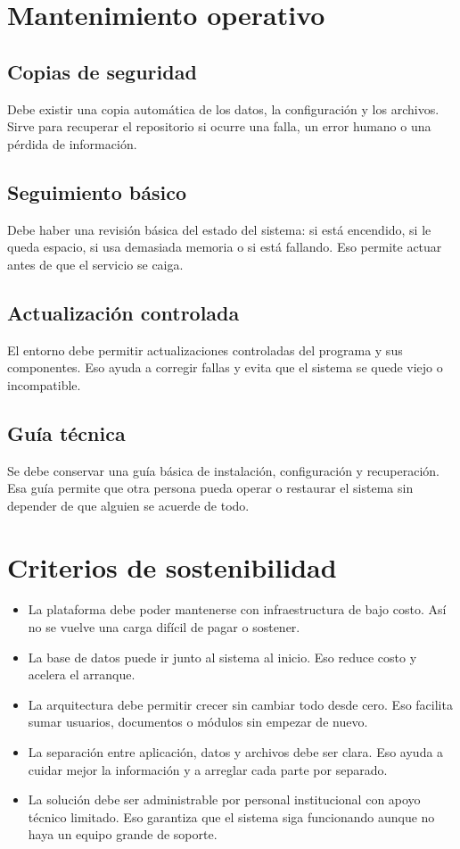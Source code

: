 \documentclass[12pt,a4paper]{report}
\begin{document}
\section*{Mantenimiento operativo}
\subsection*{Copias de seguridad}
Debe existir una copia automática de los datos, la configuración y los archivos. Sirve para recuperar el repositorio si ocurre una falla, un error humano o una pérdida de información.

\subsection*{Seguimiento básico}
Debe haber una revisión básica del estado del sistema: si está encendido, si le queda espacio, si usa demasiada memoria o si está fallando. Eso permite actuar antes de que el servicio se caiga.

\subsection*{Actualización controlada}
El entorno debe permitir actualizaciones controladas del programa y sus componentes. Eso ayuda a corregir fallas y evita que el sistema se quede viejo o incompatible.

\subsection*{Guía técnica}
Se debe conservar una guía básica de instalación, configuración y recuperación. Esa guía permite que otra persona pueda operar o restaurar el sistema sin depender de que alguien se acuerde de todo.

\section*{Criterios de sostenibilidad}
\begin{itemize}
	\item La plataforma debe poder mantenerse con infraestructura de bajo costo. Así no se vuelve una carga difícil de pagar o sostener.
	\item La base de datos puede ir junto al sistema al inicio. Eso reduce costo y acelera el arranque.
	\item La arquitectura debe permitir crecer sin cambiar todo desde cero. Eso facilita sumar usuarios, documentos o módulos sin empezar de nuevo.
	\item La separación entre aplicación, datos y archivos debe ser clara. Eso ayuda a cuidar mejor la información y a arreglar cada parte por separado.
	\item La solución debe ser administrable por personal institucional con apoyo técnico limitado. Eso garantiza que el sistema siga funcionando aunque no haya un equipo grande de soporte.
\end{itemize}
\end{document}
